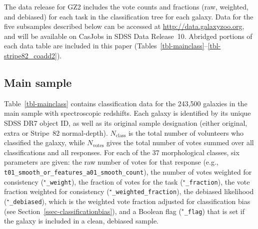 \documentclass[useAMS,usenatbib]{mn2e}
\begin{document}
The data release for GZ2 includes the vote counts and fractions (raw, weighted, and debiased) for each task in the classification tree for each galaxy. Data for the five subsamples described below can be accessed at \url{http://data.galaxyzoo.org}, and will be available on CasJobs in SDSS Data Release~10. Abridged portions of each data table are included in this paper (Tables~\ref{tbl-mainclass}--\ref{tbl-stripe82_coadd2}).

\subsection{Main sample}\label{ssec-catalogue_main}

Table~\ref{tbl-mainclass} contains classification data for the 243,500 galaxies in the main sample with spectroscopic redshifts. Each galaxy is identified by its unique SDSS DR7 object ID, as well as its original sample designation (either original, extra or Stripe~82 normal-depth). $N_\mathrm{class}$ is the total number of volunteers who classified the galaxy, while $N_\mathrm{votes}$ gives the total number of votes summed over all classifications and all responses. For each of the 37 morphological classes, six parameters are given: the raw number of votes for that response (e.g., {\tt t01\_smooth\_or\_features\_a01\_smooth\_count}), the number of votes weighted for consistency ({\tt $^\star$\_weight}), the fraction of votes for the task ({\tt $^\star$\_fraction}), the vote fraction weighted for consistency ({\tt $^\star$\_weighted\_fraction}), the debiased likelihood ({\tt $^\star$\_debiased}), which is the weighted vote fraction adjusted for classification bias (see Section~\ref{ssec-classificationbias}), and a Boolean flag ({\tt $^\star$\_flag}) that is set if the galaxy is included in a clean, debiased sample.
\end{document}
